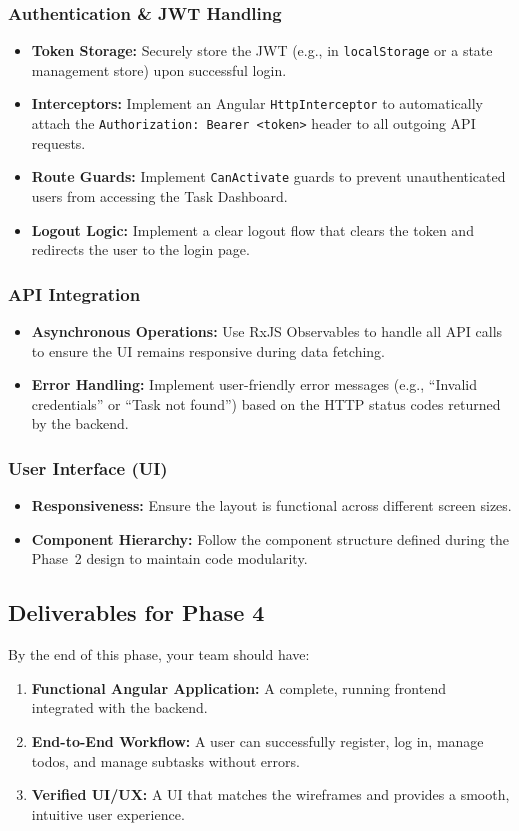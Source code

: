 \subsubsection{Authentication \& JWT Handling}
\begin{itemize}
  \item \textbf{Token Storage:} Securely store the JWT (e.g., in \texttt{localStorage} or a state management store) upon successful login.
  \item \textbf{Interceptors:} Implement an Angular \texttt{HttpInterceptor} to automatically attach the \texttt{Authorization: Bearer <token>} header to all outgoing API requests.
  \item \textbf{Route Guards:} Implement \texttt{CanActivate} guards to prevent unauthenticated users from accessing the Task Dashboard.
  \item \textbf{Logout Logic:} Implement a clear logout flow that clears the token and redirects the user to the login page.
\end{itemize}

\subsubsection{API Integration}
\begin{itemize}
  \item \textbf{Asynchronous Operations:} Use RxJS Observables to handle all API calls to ensure the UI remains responsive during data fetching.
  \item \textbf{Error Handling:} Implement user-friendly error messages (e.g., ``Invalid credentials'' or ``Task not found'') based on the HTTP status codes returned by the backend.
\end{itemize}

\subsubsection{User Interface (UI)}
\begin{itemize}
  \item \textbf{Responsiveness:} Ensure the layout is functional across different screen sizes.
  \item \textbf{Component Hierarchy:} Follow the component structure defined during the Phase~2 design to maintain code modularity.
\end{itemize}

\subsection{Deliverables for Phase 4}
By the end of this phase, your team should have:
\begin{enumerate}
  \item \textbf{Functional Angular Application:} A complete, running frontend integrated with the backend.
  \item \textbf{End-to-End Workflow:} A user can successfully register, log in, manage todos, and manage subtasks without errors.
  \item \textbf{Verified UI/UX:} A UI that matches the wireframes and provides a smooth, intuitive user experience.
\end{enumerate}

